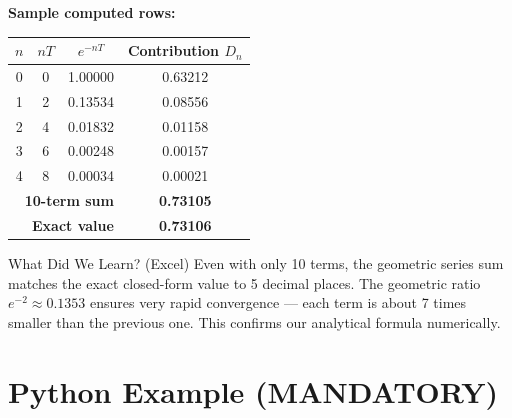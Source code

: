 \documentclass[12pt,a4paper]{article}
\begin{document}
\medskip
\noindent\textbf{Sample computed rows:}

\begin{center}
\begin{tabular}{@{}cccc@{}}
\toprule
$n$ & $nT$ & $e^{-nT}$ & Contribution $D_n$ \\
\midrule
0 & 0 & 1.00000 & 0.63212 \\
1 & 2 & 0.13534 & 0.08556 \\
2 & 4 & 0.01832 & 0.01158 \\
3 & 6 & 0.00248 & 0.00157 \\
4 & 8 & 0.00034 & 0.00021 \\
\midrule
\multicolumn{3}{r}{\textbf{10-term sum}} & \textbf{0.73105} \\
\multicolumn{3}{r}{\textbf{Exact value}} & \textbf{0.73106} \\
\bottomrule
\end{tabular}
\end{center}

\begin{learnbox}{What Did We Learn? (Excel)}
Even with only 10 terms, the geometric series sum matches the exact closed-form
value to 5 decimal places. The geometric ratio $e^{-2} \approx 0.1353$ ensures
very rapid convergence --- each term is about 7 times smaller than the previous
one. This confirms our analytical formula numerically.
\end{learnbox}

\section{Python Example (MANDATORY)}
\end{document}
